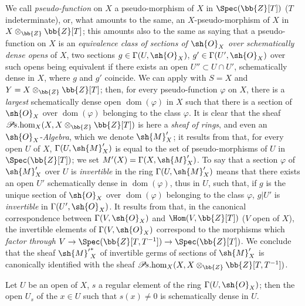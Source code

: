 \begin{env}[20.2.8]
\label{IV.20.2.8}
We call \emph{pseudo-function} on $X$ a pseudo-morphism of $X$ in $\Spec(\bb{Z}[T])$ ($T$ indeterminate), or, what amounts to the same, an $X$-pseudo-morphism of $X$ in $X\otimes_{\bb{Z}}\bb{Z}[T]$;
this amounts also to the same  as saying that a pseudo-function on $X$ is an \emph{equivalence class of sections of $\sh{O}_X$ over schematically dense opens} of $X$, two sections $g\in\Gamma(U,\sh{O}_X)$, $g'\in\Gamma(U',\sh{O}_X)$ over such opens being equivalent if there exists an open $U''\subset U\cap U'$, schematically dense in $X$, where $g$ and $g'$ coincide.
We can apply  with $S=X$ and $Y=X\otimes_{\bb{Z}}\bb{Z}[T]$;
then, for every pseudo-function $\varphi$ on $X$, there is a \emph{largest} schematically dense open $\operatorname{dom}(\varphi)$ in $X$ such that there is a section of $\sh{O}_X$ over $\operatorname{dom}(\varphi)$ belonging to the class $\varphi$.
It is clear that the sheaf $\mathscr{P}\!s.\!\operatorname{hom}_X(X,X\otimes_{\bb{Z}}\bb{Z}[T])$ is here a \emph{sheaf of rings}, and even an $\sh{O}_X$-\emph{Algebra}, which we denote $\sh{M}'_X$;
it results from  that, for every open $U$ of $X$, $\Gamma(U,\sh{M}'_X)$ is equal to the set of pseudo-morphisms of $U$ in $\Spec(\bb{Z}[T])$;
we set $M'(X)=\Gamma(X,\sh{M}'_X)$.
To say that a section $\varphi$ of $\sh{M}'_X$ over $U$ is \emph{invertible} in the ring $\Gamma(U,\sh{M}'_X)$ means that there exists an open $U'$ schematically dense in $\operatorname{dom}(\varphi)$, thus in $U$, such that, if $g$ is the unique section of $\sh{O}_X$ over $\operatorname{dom}(\varphi)$ belonging to the class $\varphi$, $g|U'$ is \emph{invertible} in $\Gamma(U',\sh{O}_X)$.
It results from  that, in the canonical correspondence between $\Gamma(V,\sh{O}_X)$ and $\Hom(V,\bb{Z}[T])$ ($V$ open of $X$), the invertible elements of $\Gamma(V,\sh{O}_X)$ correspond to the morphisms which
\emph{factor through} $V\to\Spec(\bb{Z}[T,T^{-1}])\to\Spec(\bb{Z}[T])$.
We conclude that the sheaf ${\sh{M}'}^*_X$ of invertible germs of sections of $\sh{M}'_X$ is canonically identified with the sheaf $\mathscr{P}\!s.\!\operatorname{hom}_X(X,X\otimes_{\bb{Z}}\bb{Z}[T,T^{-1}])$.
\end{env}

\begin{lemma}[20.2.9]
\label{IV.20.2.9}
Let $U$ be an open of $X$, $s$ a regular element of the ring $\Gamma(U,\sh{O}_X)$;
then the open $U_s$ of the $x\in U$ such that $s(x)\neq 0$ is schematically dense in $U$.
\end{lemma}

